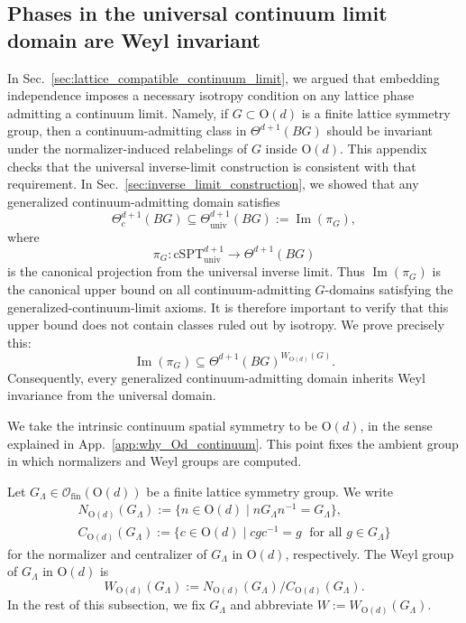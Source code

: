 \documentclass[aps,prx,reprint,superscriptaddress,twocolumn,amsmath,amssymb,amsfonts, nofootinbib]{revtex4-2}
\newcommand{\ofin}{\mathcal{O}_{\text{fin}}}
\theoremstyle{apsstyle}
\begin{document}
\subsection{Phases in the universal continuum limit domain are Weyl invariant}
\label{app:proof_isotropy}

In Sec.~\ref{sec:lattice_compatible_continuum_limit}, we argued that embedding independence imposes a necessary isotropy condition on any lattice phase admitting a continuum limit. Namely, if $G\subset \mathrm{O}(d)$ is a finite lattice symmetry group, then a continuum-admitting class in $\Theta^{d+1}(BG)$ should be invariant under the normalizer-induced relabelings of $G$ inside $\mathrm{O}(d)$. This appendix checks that the universal inverse-limit construction is consistent with that requirement. In Sec.~\ref{sec:inverse_limit_construction}, we showed that any generalized continuum-admitting domain satisfies 
\begin{equation*} 
\Theta^{d+1}_{c}(BG) \subseteq \Theta^{d+1}_{\mathrm{univ}}(BG) := \operatorname{Im}(\pi_G), 
\end{equation*} where 
\begin{equation*} 
\pi_G: \mathrm{cSPT}^{d+1}_{\mathrm{univ}} \longrightarrow \Theta^{d+1}(BG) 
\end{equation*} 
is the canonical projection from the universal inverse limit. Thus $\operatorname{Im}(\pi_G)$ is the canonical upper bound on all continuum-admitting $G$-domains satisfying the generalized-continuum-limit axioms. It is therefore important to verify that this upper bound does not contain classes ruled out by isotropy. We prove precisely this: 
\begin{equation*} 
\operatorname{Im}(\pi_G) \subseteq \Theta^{d+1}(BG)^{W_{\mathrm{O}(d)}(G)}. 
\end{equation*} 
Consequently, every generalized continuum-admitting domain inherits Weyl invariance from the universal domain.

\medskip 

\noindent We take the intrinsic continuum spatial symmetry to be $\mathrm{O}(d)$, in the sense explained in App.~\ref{app:why_Od_continuum}. This point fixes the ambient group in which normalizers and Weyl groups are computed.

\bigskip 

Let $G_{\Lambda}\in\ofin(\mathrm{O}(d))$ be a finite lattice symmetry group. We write
\begin{gather*}
N_{\mathrm{O}(d)}(G_{\Lambda}) :=
\{n\in \mathrm{O}(d)\mid nG_{\Lambda}n^{-1}=G_{\Lambda}\},\\
C_{\mathrm{O}(d)}(G_{\Lambda}) :=
\{c\in \mathrm{O}(d)\mid cgc^{-1}=g\;\text{ for all }g\in G_{\Lambda}\}
\end{gather*}
for the normalizer and centralizer of $G_{\Lambda}$ in $\mathrm{O}(d)$, respectively. The Weyl group of $G_{\Lambda}$ in $\mathrm{O}(d)$ is
\begin{equation*}
W_{\mathrm{O}(d)}(G_{\Lambda})
:= N_{\mathrm{O}(d)}(G_{\Lambda})/C_{\mathrm{O}(d)}(G_{\Lambda}).
\end{equation*}
In the rest of this subsection, we fix $G_{\Lambda}$ and abbreviate $W:=W_{\mathrm{O}(d)}(G_{\Lambda})$.
\end{document}
